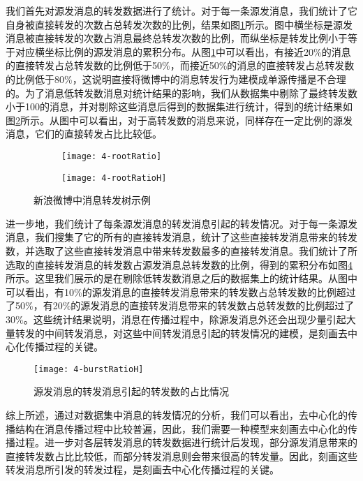 我们首先对源发消息的转发数据进行了统计。对于每一条源发消息，我们统计了它自身被直接转发的次数占总转发次数的比例，结果如图\ref{fig:rootRatioA}所示。图中横坐标是源发消息被直接转发的次数占消息最终总转发次数的比例，而纵坐标是转发比例小于等于对应横坐标比例的源发消息的累积分布。从图\ref{fig:rootRatioA}中可以看出，有接近20\%的消息的直接转发占总转发数的比例低于50\%，而接近50\%的消息的直接转发占总转发数的比例低于80\%，这说明直接将微博中的消息转发行为建模成单源传播是不合理的。为了消息低转发数消息对统计结果的影响，我们从数据集中剔除了最终转发数小于100的消息，并对剔除这些消息后得到的数据集进行统计，得到的统计结果如图\ref{fig:rootRatioB}所示。从图中可以看出，对于高转发数的消息来说，同样存在一定比例的源发消息，它们的直接转发占比比较低。
\begin{figure}[!htbp]
  \centering
  \begin{subfigure}[b]{0.5\textwidth}
    \texttt{[image: 4-rootRatio]}
    \caption{}
    \label{fig:rootRatioA}
  \end{subfigure}%
  \begin{subfigure}[b]{0.5\textwidth}
    \texttt{[image: 4-rootRatioH]}
    \caption{}
    \label{fig:rootRatioB}
  \end{subfigure}
  \caption{新浪微博中消息转发树示例}
  \label{fig:rootRatio}
\end{figure}

进一步地，我们统计了每条源发消息的转发消息引起的转发情况。对于每一条源发消息，我们搜集了它的所有的直接转发消息，统计了这些直接转发消息带来的转发数，并选取了这些直接转发消息中带来转发数最多的直接转发消息。我们统计了所选取的直接转发消息的转发数占源发消息总转发数的比例，得到的累积分布如图\ref{fig:burstRationH}所示。这里我们展示的是在剔除低转发数消息之后的数据集上的统计结果。从图中可以看出，有10\%的源发消息的直接转发消息带来的转发数占总转发数的比例超过了50\%，有20\%的源发消息的直接转发消息带来的转发数占总转发数的比例超过了30\%。这些统计结果说明，消息在传播过程中，除源发消息外还会出现少量引起大量转发的中间转发消息，对这些中间转发消息引起的转发情况的建模，是刻画去中心化传播过程的关键。
\begin{figure}[!htbp]
  \centering
  \texttt{[image: 4-burstRatioH]}
  \caption{源发消息的转发消息引起的转发数的占比情况}
  \label{fig:burstRationH}
\end{figure}

综上所述，通过对数据集中消息的转发情况的分析，我们可以看出，去中心化的传播结构在消息传播过程中比较普遍，因此，我们需要一种模型来刻画去中心化的传播过程。进一步对各层转发消息的转发数据进行统计后发现，部分源发消息带来的直接转发数占比比较低，而部分转发消息则会带来很高的转发量。因此，刻画这些转发消息所引发的转发过程，是刻画去中心化传播过程的关键。

